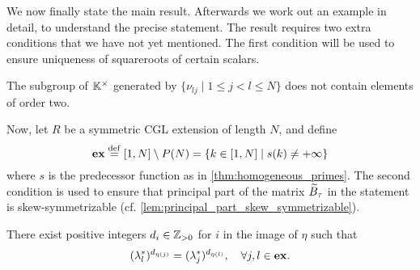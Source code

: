 We now finally state the main result. Afterwards we work out an example in detail, to
understand the precise statement. The result requires two extra conditions that we have
not yet mentioned. The first condition will be used to ensure uniqueness of squareroots
of certain scalars.\begin{condition}\label{cond:no_order_two}
	The subgroup of $\mathbb{K}^\times$ generated by $\{\nu_{lj} \mid 1 \leq j < l \leq N\}$ does not contain elements of order two.
\end{condition}
%
Now, let $R$ be a symmetric CGL extension of length $N$, and define
\begin{equation}\label{eq:ex}
	\mathbf{ex} \overset{\mathrm{def}}{=} [1 ,N] \setminus P(N) = \{k \in [1, N] \mid s(k) \neq +\infty\}
\end{equation}
where $s$ is the predecessor function as in
\cref{thm:homogeneous_primes}. The second condition is used to ensure that principal part of the matrix $\widetilde{B}_\tau$ in the statement is
skew-symmetrizable (cf. \cref{lem:principal_part_skew_symmetrizable}).
\begin{condition}\label{cond:lambda_star_to_the_d}
	There exist positive integers $d_i \in \mathbb{Z}_{>0}$ for $i$ in the image of $\eta$ such that
	\begin{equation*}
		(\lambda^*_l)^{d_{\eta(j)}} = (\lambda^*_j)^{d_{\eta(l)}}, \quad \forall j, l \in \mathbf{ex}.
	\end{equation*}
\end{condition}

